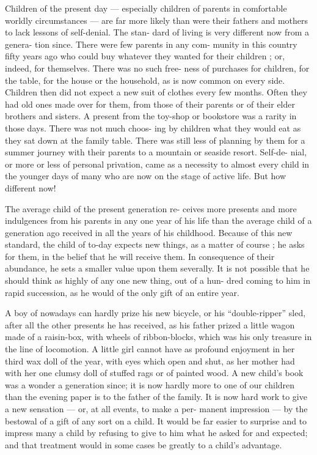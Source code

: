 \documentclass[
]{book}
\begin{document}
Children of the present day --- especially children of parents in comfortable worldly circumstances --- are far more likely than were their fathers and mothers to lack lessons of self-denial. The stan- dard of living is very different now from a genera- tion since. There were few parents in any com- munity in this country fifty years ago who could buy whatever they wanted for their children ; or, indeed, for themselves. There was no such free- ness of purchases for children, for the table, for the house or the household, as is now common on every side. Children then did not expect a new suit of clothes every few months. Often they had old ones made over for them, from those of their parents or of their elder brothers and sisters. A present from the toy-shop or bookstore was a rarity in those days. There was not much choos- ing by children what they would eat as they sat down at the family table. There was still less of planning by them for a summer journey with their parents to a mountain or seaside resort. Self-de- nial, or more or less of personal privation, came as a necessity to almost every child in the younger days of many who are now on the stage of active life. But how different now!

The average child of the present generation re- ceives more presents and more indulgences from his parents in any one year of his life than the average child of a generation ago received in all the years of his childhood. Because of this new standard, the child of to-day expects new things, as a matter of course ; he asks for them, in the belief that he will receive them. In consequence of their abundance, he sets a smaller value upon them severally. It is not possible that he should think as highly of any one new thing, out of a hun- dred coming to him in rapid succession, as he would of the only gift of an entire year.

A boy of nowadays can hardly prize his new bicycle, or his ``double-ripper'' sled, after all the other presents he has received, as his father prized a little wagon made of a raisin-box, with wheels of ribbon-blocks, which was his only treasure in the line of locomotion. A little girl cannot have as profound enjoyment in her third wax doll of the year, with eyes which open and shut, as her mother had with her one clumsy doll of stuffed rags or of painted wood. A new child's book was a wonder a generation since; it is now hardly more to one of our children than the evening paper is to the father of the family. It is now hard work to give a new sensation --- or, at all events, to make a per- manent impression --- by the bestowal of a gift of any sort on a child. It would be far easier to surprise and to impress many a child by refusing to give to him what he asked for and expected; and that treatment would in some cases be greatly to a child's advantage.
\end{document}

